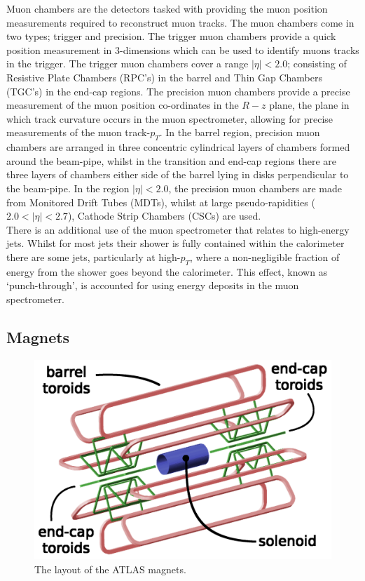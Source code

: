 Muon chambers are the detectors tasked with providing the muon position measurements required to reconstruct muon tracks.
The muon chambers come in two types; trigger and precision.
The trigger muon chambers provide a quick position measurement in 3-dimensions which can be used
to identify muons tracks in the trigger.
The trigger muon chambers cover a range $|\eta| < 2.0$;
consisting of Resistive Plate Chambers (RPC’s) in the barrel and Thin Gap Chambers (TGC’s) in the end-cap regions.
The precision muon chambers provide a precise measurement of the muon position co-ordinates in the $R-z$ plane,
the plane in which track curvature occurs in the muon spectrometer, allowing for precise measurements of the muon track-$p_T$. 
In the barrel region, precision muon chambers are arranged in three concentric cylindrical layers of chambers formed around the beam-pipe,
whilst in the transition and end-cap regions there are three layers of chambers either side of the barrel lying in disks perpendicular to the beam-pipe.
In the region $|\eta| < 2.0$, the precision muon chambers are made from Monitored Drift Tubes (MDTs),
whilst at large pseudo-rapidities ($2.0 < |\eta| < 2.7$), Cathode Strip Chambers (CSCs) are used.
\\

There is an additional use of the muon spectrometer that relates to high-energy jets.
Whilst for most jets their shower is fully contained within the calorimeter
there are some jets, particularly at high-$p_T$, where a non-negligible fraction of energy from the shower goes beyond the calorimeter.
This effect, known as `punch-through', is accounted for using energy deposits in the muon spectrometer.\\

\subsection{Magnets}
\label{sec:det-magnets}

\begin{figure}[!ht]
  \begin{center}
    \includegraphics[width=1\linewidth, angle=0]{figs/Detector/Magnet_schem.png}
  \end{center}
  \caption{
    The layout of the ATLAS magnets.}
  \label{fig:det-magnet_schem}
\end{figure}


